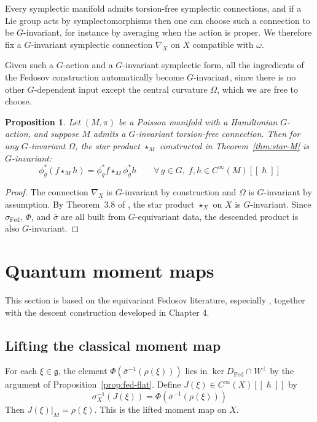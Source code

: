 \documentclass[
  12pt,
  a4paper, oneside
]{report}
\renewcommand{\hbar}{\hslash}
\theoremstyle{bolddef}
\newtheorem{proposition}[theorem]{Proposition}
\theoremstyle{remark}
\numberwithin{equation}{chapter}
\begin{document}
Every symplectic manifold admits torsion-free symplectic connections, and if a Lie group acts by symplectomorphisms then one can choose such a connection to be $G$-invariant, for instance by averaging when the action is proper. We therefore fix a $G$-invariant symplectic connection $\nabla_X$ on $X$ compatible with $\omega$.

Given such a $G$-action and a $G$-invariant symplectic form, all the ingredients of the Fedosov construction automatically become $G$-invariant, since there is no other $G$-dependent input except the central curvature $\Omega$, which we are free to choose.

\begin{proposition}\label{prop:G-inv}
Let $(M, \pi)$ be a Poisson manifold with a Hamiltonian $G$-action, and suppose $M$ admits a $G$-invariant torsion-free connection. Then for any $G$-invariant $\Omega$, the star product $\star_M$ constructed in Theorem~\ref{thm:star-M} is $G$-invariant:
\[
\phi_g^*(f \star_M h) = \phi_g^* f \star_M \phi_g^* h \qquad \forall\, g \in G,\; f, h \in C^\infty(M)[[\hbar]]
\]
\end{proposition}
\begin{proof}
The connection $\nabla_X$ is $G$-invariant by construction and $\Omega$ is $G$-invariant by assumption. By Theorem~3.8 of \cite{MBN}, the star product $\star_X$ on $X$ is $G$-invariant. Since $\sigma_{\mathrm{Fed}}$, $\Phi$, and $\bar{\sigma}$ are all built from $G$-equivariant data, the descended product is also $G$-invariant.
\end{proof}


\section*{Quantum moment maps}
This section is based on the equivariant Fedosov literature, especially \cite{MBN,RW}, together with the descent construction developed in Chapter 4.


\subsection*{Lifting the classical moment map}

For each $\xi \in \mathfrak{g}$, the element $\Phi(\bar{\sigma}^{-1}(\rho(\xi)))$ lies in $\ker D_{\mathrm{Fed}} \cap W^\perp$ by the argument of Proposition~\ref{prop:fed-flat}. Define $J(\xi) \in C^\infty(X)[[\hbar]]$ by
\begin{equation}\label{eq:J-def}
\sigma_X^{-1}(J(\xi)) = \Phi(\bar{\sigma}^{-1}(\rho(\xi)))
\end{equation}
Then $J(\xi)\big|_M = \rho(\xi)$. This is the lifted moment map on $X$.
\end{document}
